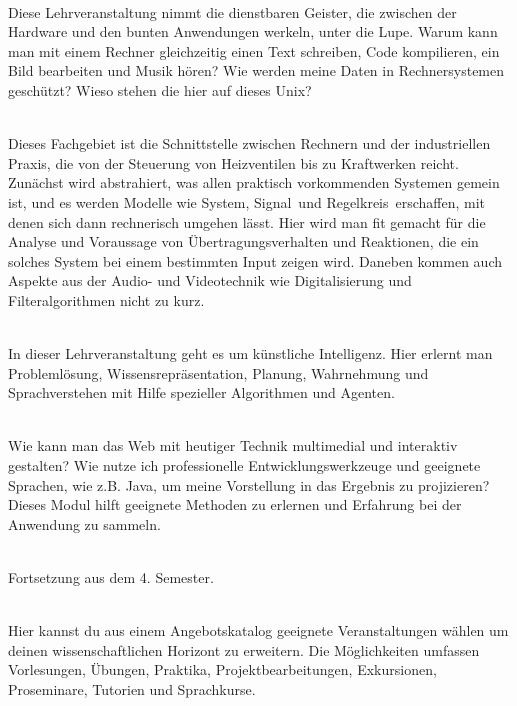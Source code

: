 
\textbf{} \\
Diese Lehrveranstaltung nimmt die dienstbaren Geister, die zwischen der Hardware und den bunten Anwendungen werkeln, unter die Lupe.
Warum kann man mit einem Rechner gleichzeitig einen Text schreiben, Code kompilieren, ein Bild bearbeiten und Musik hören?
Wie werden meine Daten in Rechnersystemen geschützt?
Wieso stehen die hier auf dieses Unix?

\textbf{} \\
Dieses Fachgebiet ist die Schnittstelle zwischen Rechnern und der industriellen Praxis, die von der Steuerung von Heizventilen bis zu Kraftwerken reicht.
Zunächst wird abstrahiert, was allen praktisch vorkommenden Systemen gemein ist, und es werden Modelle wie \glqq System\grqq, \glqq Signal\grqq\ und \glqq Regelkreis\grqq\ erschaffen, mit denen sich dann rechnerisch umgehen lässt.
Hier wird man fit gemacht für die Analyse und Voraussage von Übertragungsverhalten und Reaktionen, die ein solches System bei einem bestimmten Input zeigen wird.
Daneben kommen auch Aspekte aus der Audio- und Videotechnik wie Digitalisierung und Filteralgorithmen nicht zu kurz.

\textbf{} \\
In dieser Lehrveranstaltung geht es um künstliche Intelligenz.
Hier erlernt man Problemlösung, Wissensrepräsentation, Planung, Wahrnehmung und Sprachverstehen mit Hilfe spezieller Algorithmen und Agenten.

\textbf{} \\
Wie kann man das Web mit heutiger Technik multimedial und interaktiv gestalten?
Wie nutze ich professionelle Entwicklungswerkzeuge und geeignete Sprachen, wie z.B. Java, um meine Vorstellung in das Ergebnis zu projizieren?
Dieses Modul hilft geeignete Methoden zu erlernen und Erfahrung bei der Anwendung zu sammeln.

\textbf{} \\
Fortsetzung aus dem 4. Semester.

\textbf{} \\
Hier kannst du aus einem Angebotskatalog geeignete Veranstaltungen wählen um deinen wissenschaftlichen Horizont zu erweitern.
Die Möglichkeiten umfassen Vorlesungen, Übungen, Praktika, Projektbearbeitungen, Exkursionen, Proseminare, Tutorien und Sprachkurse.


